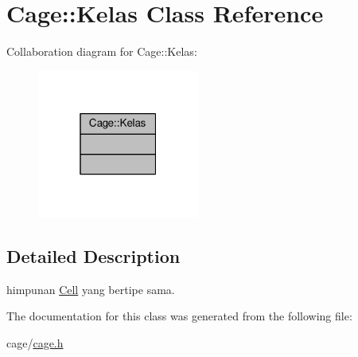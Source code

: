 \hypertarget{classCage_1_1Kelas}{}\section{Cage\+:\+:Kelas Class Reference}
\label{classCage_1_1Kelas}


Collaboration diagram for Cage\+:\+:Kelas\+:
\nopagebreak
\begin{figure}[H]
\begin{center}
\leavevmode
\includegraphics[width=151pt]{classCage_1_1Kelas__coll__graph}
\end{center}
\end{figure}


\subsection{Detailed Description}
himpunan \hyperlink{classCell}{Cell} yang bertipe sama. 

The documentation for this class was generated from the following file\+:\begin{DoxyCompactItemize}
\item 
cage/\hyperlink{cage_8h}{cage.\+h}\end{DoxyCompactItemize}
